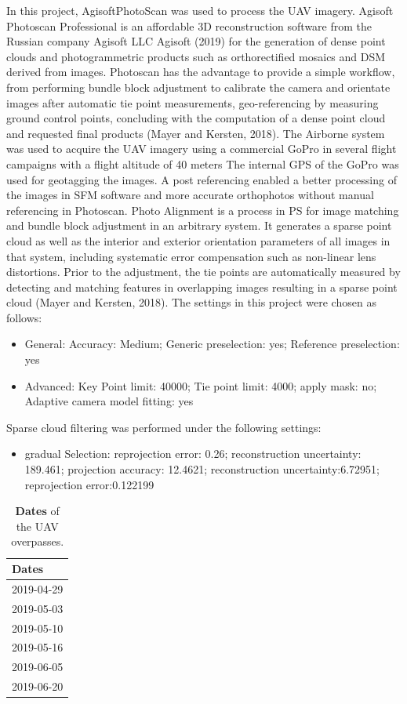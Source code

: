 \documentclass[]{article}
\providecommand{\tightlist}{%
  \setlength{\itemsep}{0pt}\setlength{\parskip}{0pt}}
\begin{document}
In this project, AgisoftPhotoScan was used to process the UAV imagery.
Agisoft Photoscan Professional is an affordable 3D reconstruction
software from the Russian company Agisoft LLC Agisoft (2019) for the
generation of dense point clouds and photogrammetric products such as
orthorectified mosaics and DSM derived from images. Photoscan has the
advantage to provide a simple workflow, from performing bundle block
adjustment to calibrate the camera and orientate images after automatic
tie point measurements, geo-referencing by measuring ground control
points, concluding with the computation of a dense point cloud and
requested final products (Mayer and Kersten, 2018). The Airborne system
was used to acquire the UAV imagery using a commercial GoPro in several
flight campaigns with a flight altitude of 40 meters The internal GPS of
the GoPro was used for geotagging the images. A post referencing enabled
a better processing of the images in SFM software and more accurate
orthophotos without manual referencing in Photoscan. Photo Alignment is
a process in PS for image matching and bundle block adjustment in an
arbitrary system. It generates a sparse point cloud as well as the
interior and exterior orientation parameters of all images in that
system, including systematic error compensation such as non-linear lens
distortions. Prior to the adjustment, the tie points are automatically
measured by detecting and matching features in overlapping images
resulting in a sparse point cloud (Mayer and Kersten, 2018). The
settings in this project were chosen as follows:

\begin{itemize}
\item
  General: Accuracy: Medium; Generic preselection: yes; Reference
  preselection: yes
\item
  Advanced: Key Point limit: 40000; Tie point limit: 4000; apply mask:
  no; Adaptive camera model fitting: yes
\end{itemize}

Sparse cloud filtering was performed under the following settings:

\begin{itemize}
\tightlist
\item
  gradual Selection: reprojection error: 0.26; reconstruction
  uncertainty: 189.461; projection accuracy: 12.4621; reconstruction
  uncertainty:6.72951; reprojection error:0.122199
\end{itemize}

\begin{table}[!h]

\caption{\label{tab:dates-table}\textbf{Dates} of the UAV overpasses.}
\centering
\begin{tabular}[t]{l}
\toprule
Dates\\
\midrule
2019-04-29\\
2019-05-03\\
2019-05-10\\
2019-05-16\\
2019-06-05\\
2019-06-20\\
\bottomrule
\end{tabular}
\end{table}
\end{document}
